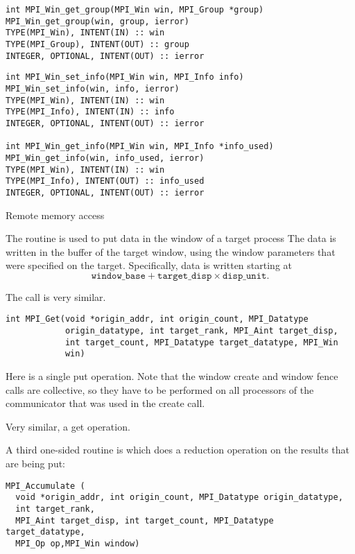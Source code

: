 \begin{verbatim}
int MPI_Win_get_group(MPI_Win win, MPI_Group *group) 
MPI_Win_get_group(win, group, ierror) 
TYPE(MPI_Win), INTENT(IN) :: win 
TYPE(MPI_Group), INTENT(OUT) :: group 
INTEGER, OPTIONAL, INTENT(OUT) :: ierror
\end{verbatim}

\begin{verbatim}
int MPI_Win_set_info(MPI_Win win, MPI_Info info)
MPI_Win_set_info(win, info, ierror)
TYPE(MPI_Win), INTENT(IN) :: win
TYPE(MPI_Info), INTENT(IN) :: info
INTEGER, OPTIONAL, INTENT(OUT) :: ierror

int MPI_Win_get_info(MPI_Win win, MPI_Info *info_used)
MPI_Win_get_info(win, info_used, ierror)
TYPE(MPI_Win), INTENT(IN) :: win
TYPE(MPI_Info), INTENT(OUT) :: info_used
INTEGER, OPTIONAL, INTENT(OUT) :: ierror
\end{verbatim}

 {Remote memory access}

The  routine is used to put data in the window
of a target process
%
%
The data is written in the buffer of the target window,
using the window parameters that were specified on the target.
Specifically, data is written starting at
\[ \mathtt{window\_base} + \mathtt{target\_disp}\times \mathtt{disp\_unit}. \]

The  call is very similar.
\begin{verbatim}
int MPI_Get(void *origin_addr, int origin_count, MPI_Datatype
            origin_datatype, int target_rank, MPI_Aint target_disp,
            int target_count, MPI_Datatype target_datatype, MPI_Win
            win)
\end{verbatim}

Here is a single put operation. Note that the window create and window fence calls
are collective, so they have to be performed on all processors
of the communicator that was used in the create call.

Very similar, a get operation.

A third one-sided routine
is  which does a reduction operation on the results
that are being put:
\begin{verbatim}
MPI_Accumulate (
  void *origin_addr, int origin_count, MPI_Datatype origin_datatype, 
  int target_rank,
  MPI_Aint target_disp, int target_count, MPI_Datatype target_datatype,
  MPI_Op op,MPI_Win window)
\end{verbatim}

